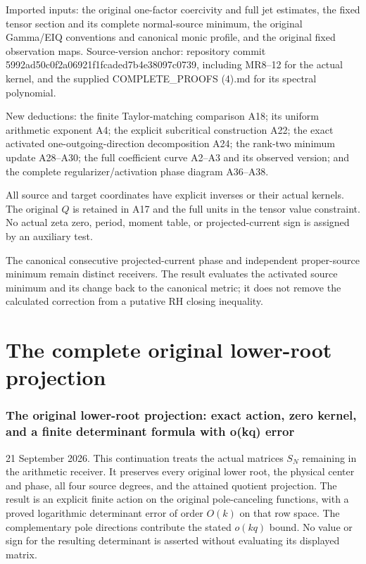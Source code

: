 \documentclass[11pt]{article}
\begin{document}
Imported inputs: the original one-factor coercivity and full jet estimates, the fixed tensor section and its complete normal-source minimum, the original Gamma/EIQ conventions and canonical monic profile, and the original fixed observation maps. Source-version anchor: repository commit 5992ad50c0f2a06921f1fcaded7b4e38097c0739, including MR8--12 for the actual kernel, and the supplied COMPLETE\_PROOFS (4).md for its spectral polynomial.

New deductions: the finite Taylor-matching comparison A18; its uniform arithmetic exponent A4; the explicit subcritical construction A22; the exact activated one-outgoing-direction decomposition A24; the rank-two minimum update A28--A30; the full coefficient curve A2--A3 and its observed version; and the complete regularizer/activation phase diagram A36--A38.

All source and target coordinates have explicit inverses or their actual kernels. The original \(Q\) is retained in A17 and the full units in the tensor value constraint. No actual zeta zero, period, moment table, or projected-current sign is assigned by an auxiliary test.

The canonical consecutive projected-current phase and independent proper-source minimum remain distinct receivers. The result evaluates the activated source minimum and its change back to the canonical metric; it does not remove the calculated correction from a putative RH closing inequality.

\clearpage\part{The complete original lower-root projection}
\section{The original lower-root projection: exact action, zero kernel, and a finite determinant formula with o(kq) error}\label{the-original-lower-root-projection-exact-action-zero-kernel-and-a-finite-determinant-formula-with-okq-error}

21 September 2026. This continuation treats the actual matrices \(S_N\) remaining in the arithmetic receiver. It preserves every original lower root, the physical center and phase, all four source degrees, and the attained quotient projection. The result is an explicit finite action on the original pole-canceling functions, with a proved logarithmic determinant error of order \(O(k)\) on that row space. The complementary pole directions contribute the stated \(o(kq)\) bound. No value or sign for the resulting determinant is asserted without evaluating its displayed matrix.
\end{document}
